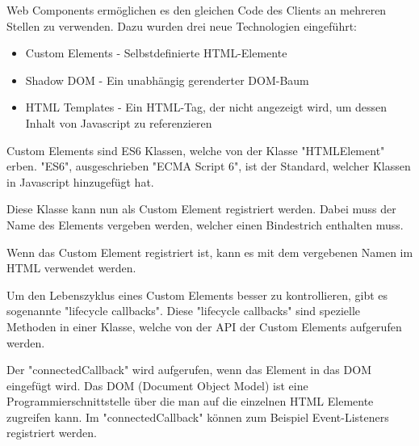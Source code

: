 
Web Components ermöglichen es den gleichen Code des Clients an mehreren Stellen zu verwenden. Dazu wurden drei neue Technologien \cite{MDNWebComponents} eingeführt:

\begin{itemize}
    \item Custom Elements - Selbstdefinierte HTML-Elemente
    \item Shadow DOM - Ein unabhängig gerenderter DOM-Baum
    \item HTML Templates - Ein HTML-Tag, der nicht angezeigt wird, um dessen Inhalt von Javascript zu referenzieren
\end{itemize}




Custom Elements sind ES6 Klassen, welche von der Klasse "HTMLElement" erben. "ES6", ausgeschrieben "ECMA Script 6", ist der Standard, welcher Klassen in Javascript hinzugefügt hat.\cite{MDNes6Classes}


Diese Klasse kann nun als Custom Element registriert werden. Dabei muss der Name des Elements vergeben werden, welcher einen Bindestrich enthalten muss.


Wenn das Custom Element registriert ist, kann es mit dem vergebenen Namen im HTML verwendet werden.



Um den Lebenszyklus eines Custom Elements besser zu kontrollieren, gibt es sogenannte "lifecycle callbacks". Diese "lifecycle callbacks" sind spezielle Methoden in einer Klasse, welche von der API der Custom Elements aufgerufen werden.

Der "{\ttfamily connectedCallback}" wird aufgerufen, wenn das Element in das DOM eingefügt wird. Das DOM (Document Object Model) ist eine Programmierschnittstelle über die man auf die einzelnen HTML Elemente zugreifen kann. \cite{MDNDOM} Im "{\ttfamily connectedCallback}" können zum Beispiel Event-Listeners registriert werden.

